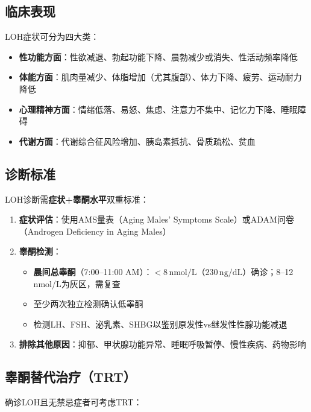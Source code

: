 \subsection{临床表现}

LOH症状可分为四大类：

\begin{itemize}[leftmargin=2cm]
	\item \textbf{性功能方面}：性欲减退、勃起功能下降、晨勃减少或消失、性活动频率降低
	\item \textbf{体能方面}：肌肉量减少、体脂增加（尤其腹部）、体力下降、疲劳、运动耐力降低
	\item \textbf{心理精神方面}：情绪低落、易怒、焦虑、注意力不集中、记忆力下降、睡眠障碍
	\item \textbf{代谢方面}：代谢综合征风险增加、胰岛素抵抗、骨质疏松、贫血
\end{itemize}

\subsection{诊断标准}

LOH诊断需\textbf{症状+睾酮水平}双重标准：

\begin{enumerate}
	\item \textbf{症状评估}：使用AMS量表（Aging Males' Symptoms Scale）或ADAM问卷（Androgen Deficiency in Aging Males）
	\item \textbf{睾酮检测}：
		\begin{itemize}
		\item \textbf{晨间总睾酮}（7:00--11:00 AM）：$<8\,\mathrm{nmol/L}$（$230\,\mathrm{ng/dL}$）确诊；8--12 nmol/L为灰区，需复查
		\item 至少两次独立检测确认低睾酮
		\item 检测LH、FSH、泌乳素、SHBG以鉴别原发性vs继发性性腺功能减退
		\end{itemize}
	\item \textbf{排除其他原因}：抑郁、甲状腺功能异常、睡眠呼吸暂停、慢性疾病、药物影响
\end{enumerate}

\subsection{睾酮替代治疗（TRT）}

确诊LOH且无禁忌症者可考虑TRT：

